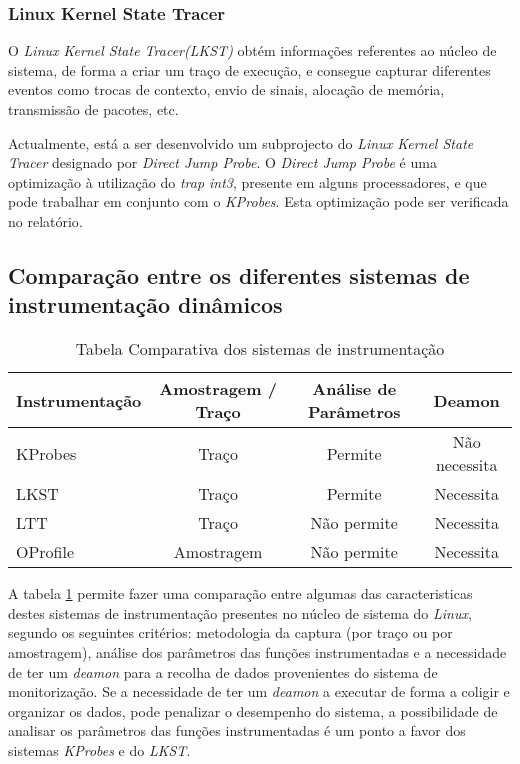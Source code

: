 \subsubsection{Linux Kernel State Tracer}

O \textit{Linux Kernel State Tracer(LKST)} obtém informações referentes ao núcleo de sistema, de forma a criar um traço de execução, e consegue capturar diferentes eventos como trocas de contexto, envio de sinais, alocação de memória, transmissão de pacotes, etc.

Actualmente, está a ser desenvolvido um subprojecto do \textit{Linux Kernel State Tracer} designado por \textit{Direct Jump Probe}.
O \textit{Direct Jump Probe} é uma optimização à utilização do \textit{trap int3}, presente em alguns processadores, e que pode trabalhar em conjunto com o \textit{KProbes}.
Esta optimização pode ser verificada no relatório\cite{Hiramatsu2005}.

\subsection{Comparação entre os diferentes sistemas de instrumentação dinâmicos}
\begin{table}[h!]
\begin{center}
\caption{Tabela Comparativa dos sistemas de instrumentação}
\label{tab:inst_compare}
\begin{tabular}{|l||c|c|c|}
\hline
Instrumentação & Amostragem / Traço & Análise de Parâmetros & Deamon \\
\hline
KProbes & Traço & Permite & Não necessita \\
\hline
LKST & Traço & Permite & Necessita \\
\hline
LTT & Traço & Não permite & Necessita \\
\hline
OProfile & Amostragem & Não permite & Necessita \\
\hline

\end{tabular}
\end{center}
\end{table}

A tabela \ref{tab:inst_compare} permite fazer uma comparação entre algumas das caracteristicas destes sistemas de instrumentação presentes no núcleo de sistema do \textit{Linux}, segundo os seguintes critérios: metodologia da captura (por traço ou por amostragem), análise dos parâmetros das funções instrumentadas e a necessidade de ter um \textit{deamon} para a recolha de dados provenientes do sistema de monitorização.
Se a necessidade de ter um \textit{deamon} a executar de forma a coligir e organizar os dados, pode penalizar o desempenho do sistema, a possibilidade de analisar os parâmetros das funções instrumentadas é um ponto a favor dos sistemas \textit{KProbes} e do \textit{LKST}.

